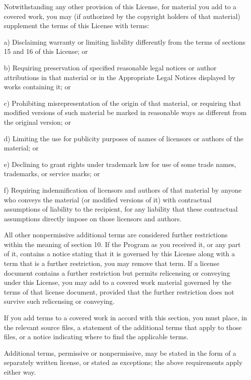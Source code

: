 \documentclass[letterpaper,10pt,english]{sphinxmanual}
\begin{document}
\begin{sphinxVerbatim}[commandchars=\\\{\}]
  Notwithstanding any other provision of this License, for material you
add to a covered work, you may (if authorized by the copyright holders of
that material) supplement the terms of this License with terms:

    a) Disclaiming warranty or limiting liability differently from the
    terms of sections 15 and 16 of this License; or

    b) Requiring preservation of specified reasonable legal notices or
    author attributions in that material or in the Appropriate Legal
    Notices displayed by works containing it; or

    c) Prohibiting misrepresentation of the origin of that material, or
    requiring that modified versions of such material be marked in
    reasonable ways as different from the original version; or

    d) Limiting the use for publicity purposes of names of licensors or
    authors of the material; or

    e) Declining to grant rights under trademark law for use of some
    trade names, trademarks, or service marks; or

    f) Requiring indemnification of licensors and authors of that
    material by anyone who conveys the material (or modified versions of
    it) with contractual assumptions of liability to the recipient, for
    any liability that these contractual assumptions directly impose on
    those licensors and authors.

  All other non\PYGZhy{}permissive additional terms are considered \PYGZdq{}further
restrictions\PYGZdq{} within the meaning of section 10.  If the Program as you
received it, or any part of it, contains a notice stating that it is
governed by this License along with a term that is a further
restriction, you may remove that term.  If a license document contains
a further restriction but permits relicensing or conveying under this
License, you may add to a covered work material governed by the terms
of that license document, provided that the further restriction does
not survive such relicensing or conveying.

  If you add terms to a covered work in accord with this section, you
must place, in the relevant source files, a statement of the
additional terms that apply to those files, or a notice indicating
where to find the applicable terms.

  Additional terms, permissive or non\PYGZhy{}permissive, may be stated in the
form of a separately written license, or stated as exceptions;
the above requirements apply either way.


\end{sphinxVerbatim}
\end{document}
